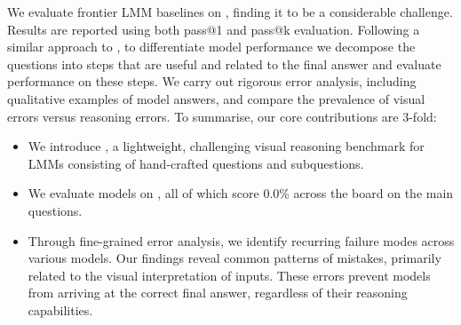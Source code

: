 We evaluate \nmodelsevaluated frontier LMM baselines on \benchmarkName, finding it to be a considerable challenge. Results are reported using both pass@1 and pass@k evaluation. Following a similar approach to \cite{xu2024theagentcompanybenchmarkingllmagents}, to differentiate model performance we decompose the questions into steps that are useful and related to the final answer and evaluate performance on these steps. We carry out rigorous error analysis, including qualitative examples of model answers, and compare the prevalence of visual errors versus reasoning errors. To summarise, our core contributions are 3-fold:
\begin{itemize}
    \item We introduce \benchmarkName, a lightweight, challenging visual reasoning benchmark for LMMs consisting of \nquestions hand-crafted questions and \nsubquestions subquestions.%
    \item We evaluate \nmodelsevaluated models on \benchmarkName, all of which%
    score 0.0\% across the board on the main questions.
        \item Through fine-grained error analysis, we identify recurring failure modes across various models. Our findings reveal common patterns of mistakes, primarily related to the visual interpretation of inputs. These errors prevent models from arriving at the correct final answer, regardless of their reasoning capabilities.
\end{itemize}









